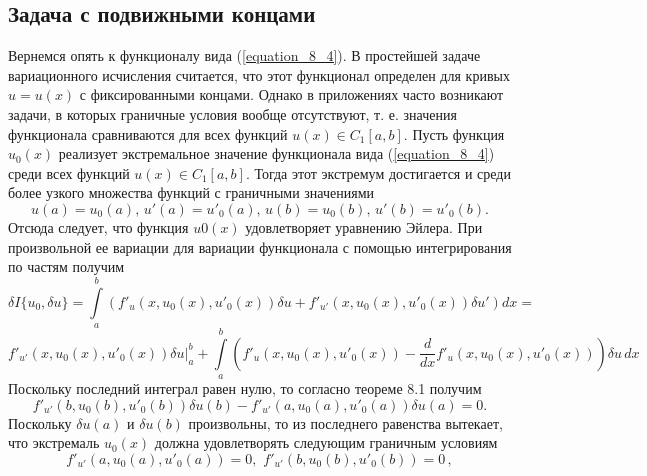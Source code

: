 
	\subsection{Задача с подвижными концами}

	Вернемся опять к функционалу вида (\ref{equation_8_4}). В простейшей задаче вариационного исчисления считается, что этот функционал определен для кривых $u=u(x)$ с фиксированными концами. Однако в приложениях часто возникают задачи, в которых граничные условия вообще отсутствуют, т. е. значения функционала сравниваются для всех функций $u(x)\in C_1[a, b]$. Пусть функция $u_0(x)$ реализует экстремальное значение функционала вида (\ref{equation_8_4}) среди всех функций $u(x)\in C_1[a, b]$. Тогда этот экстремум достигается и среди более узкого множества функций с граничными значениями
	$$u(a)=u_0(a),\,u'(a)=u'_0(a),\,u(b)=u_0(b),\,u'(b)=u'_0(b).$$
	Отсюда следует, что функция $u0(x)$ удовлетворяет уравнению Эйлера. При произвольной ее вариации для вариации функционала с помощью интегрирования по частям получим
$$\textstyle \delta I\{u_0,\delta u\}= \int\limits^b_a (f'_u(x,u_0(x),u'_0(x))\delta u +f'_{u'}(x,u_0(x),u'_0(x))\delta u')dx=$$
$$\textstyle f'_{u'}(x,u_0(x),u'_0(x))\delta u \big|^b_a +\int\limits^b_a (f'_u(x,u_0(x),u'_0(x))-{\displaystyle \frac{d}{dx}}f'_u(x,u_0(x),u'_0(x)))\delta u\,dx$$
	Поскольку последний интеграл равен нулю, то согласно теореме 8.1 получим
	$$f'_{u'}(b,u_0(b),u'_0(b))\delta u(b)-f'_{u'}(a,u_0(a),u'_0(a))\delta u(a)=0.$$
	Поскольку $\delta u(a)$ и $\delta u(b)$ произвольны, то из последнего равенства вытекает, что экстремаль $u_0(x)$ должна удовлетворять следующим граничным условиям
	\begin{equation}
	\label{equation_8_12}
 		 f'_{u'}(a,u_0(a),u'_0(a))=0,\,\,f'_{u'}(b,u_0(b),u'_0(b))=0\,,
	\end{equation}

